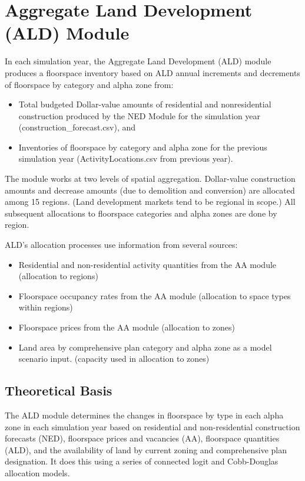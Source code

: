 \chapter{Aggregate Land Development (ALD) Module}

In each simulation year, the Aggregate Land Development (ALD) module produces a floorspace inventory based on ALD annual increments and decrements of floorspace by category and alpha zone from:
\begin{itemize}
\item Total budgeted Dollar-value amounts of residential and nonresidential construction produced by the NED Module for the simulation year (construction\_forecast.csv), and
\item Inventories of floorspace by category and alpha zone for the previous simulation year (ActivityLocations.csv from previous year).
\end{itemize}

\noindent The module works at two levels of spatial aggregation. Dollar-value construction amounts and decrease amounts (due to demolition and conversion) are allocated among 15 regions. (Land development markets tend to be regional in scope.)  All subsequent allocations to floorspace categories and alpha zones are done by region.

ALD's allocation processes use information from several sources:
\begin{itemize}
\item Residential and non-residential activity quantities from the AA module (allocation to regions)
\item Floorspace occupancy rates from the AA module (allocation to space types within regions)
\item Floorspace prices from the AA module (allocation to zones)
\item Land area by comprehensive plan category and alpha zone as a model scenario input. (capacity used in allocation to zones)
\end{itemize}

\section{Theoretical Basis}
The ALD module determines the changes in floorspace by type in each alpha zone in each simulation year based on residential and non-residential construction forecasts (NED), floorspace prices and vacancies (AA), floorspace quantities (ALD), and the availability of land by current zoning and comprehensive plan designation. It does this using a series of connected logit and Cobb-Douglas allocation models.


